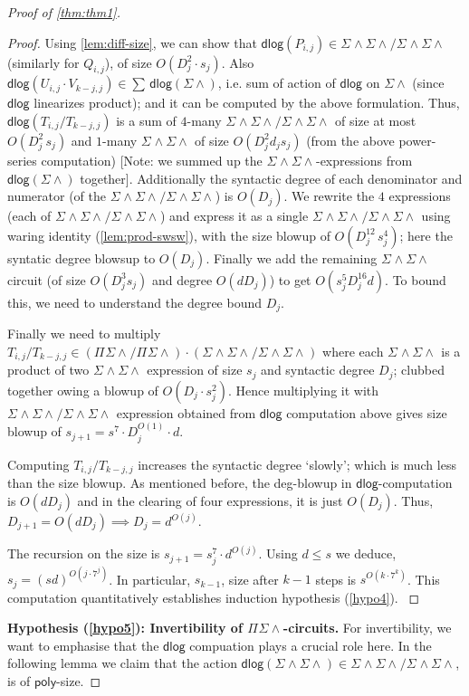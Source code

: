\documentclass[10pt,a4paper]{article}
\newcommand{\poly}{\mathsf{poly}}
\newcommand{\dlg}{\mathsf{dlog}}
\newcommand{\PSU}[2]{\Pi^{#1} \Sigma\wedge^{#2}}
\newcommand{\SWSU}[2]{\Sigma^{#1}\!\wedge\!\Sigma\!\wedge^{#2}}
\numberwithin{equation}{section}
\begin{document}
\begin{proof}[Proof of \autoref{thm:thm1}]
\begin{proof}
Using \autoref{lem:diff-size}, we can show that $\dlg(P_{i,j}) \in \SWSU{}{}/\SWSU{}{}$ (similarly for $Q_{i,j}$), of size $O(D_{j}^2 \cdot s_j)$. Also $\dlg(U_{i,j} \cdot V_{k-j,j}) \in \sum \,\dlg(\Sigma \wedge)$, i.e. sum of action of $\dlg$ on $\Sigma \wedge$ (since $\dlg$ linearizes product); and it can be computed by the above formulation. 
Thus, $\dlg(T_{i,j}/T_{k-j,j})$ is a sum of $4$-many  $\SWSU{}{}/\SWSU{}{}$ of size at most $O(D_{j}^2\,s_j)$ and $1$-many $\SWSU{}{}$ of size $O(D_j^2 d_j s_j)$ (from the above power-series computation) [Note: we summed up the $\SWSU{}{}$-expressions from $\dlg(\Sigma \wedge)$ together]. Additionally the syntactic degree of each denominator and numerator (of the $\SWSU{}{}{}/\SWSU{}{}{}$) is $O(D_j)$. We rewrite the $4$ expressions (each of $\SWSU{}{}{}/\SWSU{}{}{}$) and express it as a single $\SWSU{}{}/\SWSU{}{}$ using waring identity (\autoref{lem:prod-swsw}), with the size blowup of $O(D_{j}^{12}\,s_j^{4})$; here the syntatic degree blowsup to $O(D_j)$. Finally we add the remaining $\SWSU{}{}$ circuit (of size $O(D_j^3 s_j)$ and degree $O(dD_j)$) to get $O(s_j^{5} D_{j}^{16}d)$. To bound this, we need to understand the degree bound $D_j$. 

Finally we need to multiply $T_{i,j}/T_{k-j,j} \in (\PSU{}{}/\PSU{}{}) \cdot (\SWSU{}{}/\SWSU{}{})$ where each $\SWSU{}{}$ is a product of two $\SWSU{}{}$ expression of size $s_j$ and syntactic degree $D_j$; clubbed together owing a blowup of $O(D_j \cdot s_j^2)$. Hence multiplying it with $\SWSU{}{} / \SWSU{}{}$ expression obtained from $\dlg$ computation above gives size blowup of $s_{j+1} = s^7 \cdot D_j^{O(1)} \cdot d$.

Computing $T_{i,j}/T_{k-j,j}$ increases the syntactic degree `slowly'; which is much less than the size blowup.
As mentioned before, the deg-blowup in $\dlg$-computation is $O(dD_j)$ and in the clearing of four expressions, it is just $O(D_j)$. Thus, $D_{j+1}= O(dD_j) \implies D_j= d^{O(j)}$. 
 
The recursion on the size is $s_{j+1} = s_j^{7} \cdot d^{O(j)}$. Using $d \le s$ we deduce, $s_j= (sd)^{O(j \cdot 7^j)}$. In particular, $s_{k-1}$, size after $k-1$ steps is $s^{O(k \cdot 7^k)}$. This computation quantitatively establishes induction hypothesis (\ref{hypo4}).
\label{deg-bound-thm1}
\end{proof}

\smallskip

\noindent \textbf{Hypothesis (\ref{hypo5}): Invertibility of $\PSU{}{}$-circuits.} For invertibility, we want to emphasise that the $\dlg$ compuation plays a crucial role here. In the following lemma we claim that the action $\dlg(\SWSU{}{}) \in \SWSU{}{}{}/\SWSU{}{}{}$, is of $\poly$-size. 


\end{proof}
\end{document}
